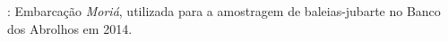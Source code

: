 \label{fig:baleia1}: Embarcação \textit{Moriá}, utilizada para a amostragem de baleias-jubarte no Banco dos Abrolhos em 2014.

